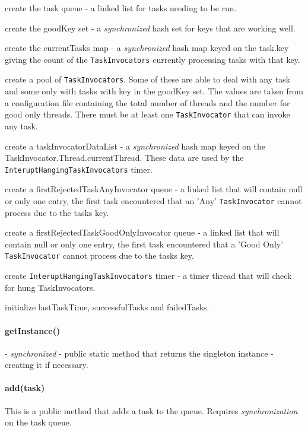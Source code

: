 \begin{code}
\item create the task queue - a linked list for tasks needing to be run.
\item create the goodKey set - a \emph{synchronized} hash set for keys that are 
working well.
\item create the currentTasks map - a \emph{synchronized} hash map keyed on the 
task.key giving the count of the \texttt{TaskInvocators} currently processing 
tasks with that key.
\item create a pool of \texttt{TaskInvocators}. Some of these are able to deal 
with any task and some only with tasks with key in the goodKey set. The values 
are taken from a configuration file containing the total number of threads and 
the number for good only threads. There must be at least one 
\texttt{TaskInvocator} that can invoke any task.
\item create a taskInvocatorDataList - a \emph{synchronized} hash map keyed on 
the TaskInvocator.Thread.currentThread. These data are used by the 
\texttt{InteruptHangingTaskInvocators} timer.
\item create a firstRejectedTaskAnyInvocator queue - a linked list that will 
contain null or only one entry, the first task encountered that an 'Any' 
\texttt{TaskInvocator} cannot process due to the tasks key.
\item create a firstRejectedTaskGoodOnlyInvocator queue - a linked list that 
will contain null or only one entry, the first task encountered that a 'Good 
Only' \texttt{TaskInvocator} cannot process due to the tasks key.
\item create \texttt{InteruptHangingTaskInvocators} timer - a timer thread that 
will check for hung TaskInvocators.
\item initialize lastTaskTime, successfulTasks and failedTasks.
\end{code}

\paragraph{getInstance()}
- \emph{synchronized} - public static method that returns the singleton 
instance - creating it if necessary.

\paragraph{add(task)}
This is a public method that adds a task to the queue. Requires 
\emph{synchronization} on the task queue.

